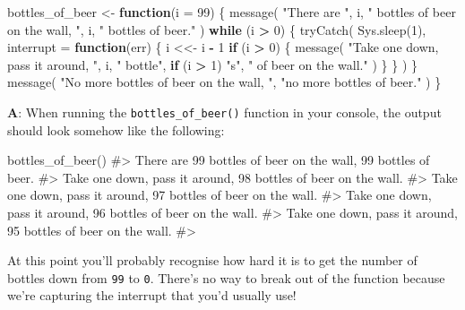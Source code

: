 \documentclass[
]{krantz}
\makeatletter
\newenvironment{Shaded}{\begin{snugshade}}{\end{snugshade}}
\newcommand{\CommentTok}[1]{\textcolor[rgb]{0.56,0.35,0.01}{\textit{#1}}}
\newcommand{\ControlFlowTok}[1]{\textcolor[rgb]{0.13,0.29,0.53}{\textbf{#1}}}
\newcommand{\DataTypeTok}[1]{\textcolor[rgb]{0.13,0.29,0.53}{#1}}
\newcommand{\DecValTok}[1]{\textcolor[rgb]{0.00,0.00,0.81}{#1}}
\newcommand{\KeywordTok}[1]{\textcolor[rgb]{0.13,0.29,0.53}{\textbf{#1}}}
\newcommand{\NormalTok}[1]{#1}
\newcommand{\OperatorTok}[1]{\textcolor[rgb]{0.81,0.36,0.00}{\textbf{#1}}}
\newcommand{\StringTok}[1]{\textcolor[rgb]{0.31,0.60,0.02}{#1}}
\newenvironment{kframe}{%
\medskip{}
\setlength{\fboxsep}{.8em}
 \def\at@end@of@kframe{}%
 \ifinner\ifhmode%
  \def\at@end@of@kframe{\end{minipage}}%
  \begin{minipage}{\columnwidth}%
 \fi\fi%
 \def\FrameCommand##1{\hskip\@totalleftmargin \hskip-\fboxsep
 \colorbox{shadecolor}{##1}\hskip-\fboxsep
     \hskip-\linewidth \hskip-\@totalleftmargin \hskip\columnwidth}%
 \MakeFramed {\advance\hsize-\width
   \@totalleftmargin\z@ \linewidth\hsize
   \@setminipage}}%
 {\par\unskip\endMakeFramed%
 \at@end@of@kframe}
\renewenvironment{Shaded}{\begin{kframe}}{\end{kframe}}
\renewcommand{\KeywordTok} [1]{\textcolor[rgb]{0.00,0.44,0.13}{{#1}}}
\renewcommand{\DataTypeTok}[1]{\textcolor[rgb]{0.56,0.13,0.00}{{#1}}}
\renewcommand{\DecValTok}  [1]{\textcolor[rgb]{0.25,0.63,0.44}{{#1}}}
\renewcommand{\StringTok}  [1]{\textcolor[rgb]{0.25,0.44,0.63}{{#1}}}
\renewcommand{\CommentTok} [1]{\textcolor[rgb]{0.38,0.63,0.69}{{#1}}}
\renewcommand{\NormalTok}  [1]{{#1}}
\makeatother
\begin{document}
\begin{Shaded}
\begin{Highlighting}[]
\NormalTok{bottles_of_beer <-}\StringTok{ }\ControlFlowTok{function}\NormalTok{(}\DataTypeTok{i =} \DecValTok{99}\NormalTok{) \{}
  \KeywordTok{message}\NormalTok{(}
    \StringTok{"There are "}\NormalTok{, i,}
    \StringTok{" bottles of beer on the wall, "}\NormalTok{, i,}
    \StringTok{" bottles of beer."}
\NormalTok{  )}
  \ControlFlowTok{while}\NormalTok{ (i }\OperatorTok{>}\StringTok{ }\DecValTok{0}\NormalTok{) \{}
    \KeywordTok{tryCatch}\NormalTok{(}
      \KeywordTok{Sys.sleep}\NormalTok{(}\DecValTok{1}\NormalTok{),}
      \DataTypeTok{interrupt =} \ControlFlowTok{function}\NormalTok{(err) \{}
\NormalTok{        i <<-}\StringTok{ }\NormalTok{i }\OperatorTok{-}\StringTok{ }\DecValTok{1}
        \ControlFlowTok{if}\NormalTok{ (i }\OperatorTok{>}\StringTok{ }\DecValTok{0}\NormalTok{) \{}
          \KeywordTok{message}\NormalTok{(}
            \StringTok{"Take one down, pass it around, "}\NormalTok{, i,}
            \StringTok{" bottle"}\NormalTok{, }\ControlFlowTok{if}\NormalTok{ (i }\OperatorTok{>}\StringTok{ }\DecValTok{1}\NormalTok{) }\StringTok{"s"}\NormalTok{, }\StringTok{" of beer on the wall."}
\NormalTok{          )}
\NormalTok{        \}}
\NormalTok{      \}}
\NormalTok{    )}
\NormalTok{  \}}
  \KeywordTok{message}\NormalTok{(}
    \StringTok{"No more bottles of beer on the wall, "}\NormalTok{,}
    \StringTok{"no more bottles of beer."}
\NormalTok{  )}
\NormalTok{\}}
\end{Highlighting}
\end{Shaded}

\textbf{{A}}: When running the \texttt{bottles\_of\_beer()} function in your console, the output should look somehow like the following:

\begin{Shaded}
\begin{Highlighting}[]
\KeywordTok{bottles_of_beer}\NormalTok{()}
\CommentTok{#> There are 99 bottles of beer on the wall, 99 bottles of beer.}
\CommentTok{#> Take one down, pass it around, 98 bottles of beer on the wall.}
\CommentTok{#> Take one down, pass it around, 97 bottles of beer on the wall.}
\CommentTok{#> Take one down, pass it around, 96 bottles of beer on the wall.}
\CommentTok{#> Take one down, pass it around, 95 bottles of beer on the wall.}
\CommentTok{#> }
\end{Highlighting}
\end{Shaded}

At this point you'll probably recognise how hard it is to get the number of bottles down from \texttt{99} to \texttt{0}. There's no way to break out of the function because we're capturing the interrupt that you'd usually use!
\end{document}
